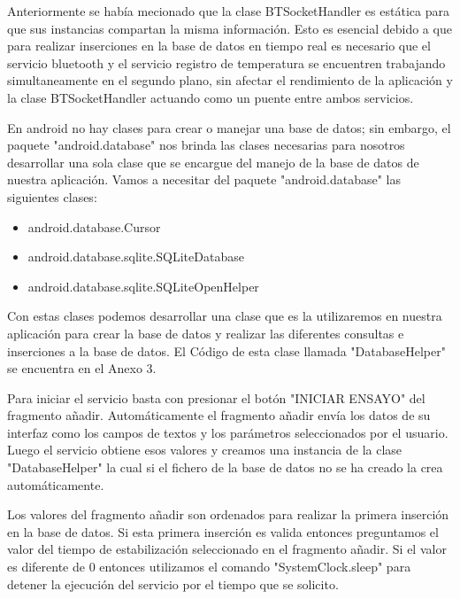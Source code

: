 \par \noindent
Anteriormente se había mecionado que la clase BTSocketHandler es estática para que sus instancias compartan la misma información. Esto es esencial debido a que para realizar inserciones en la base de datos en tiempo real es necesario que el servicio bluetooth y el servicio registro de temperatura se encuentren trabajando simultaneamente en el segundo plano, sin afectar el rendimiento de la aplicación y la clase BTSocketHandler actuando como un puente entre ambos servicios.

\par \noindent
En android no hay clases para crear o manejar una base de datos; sin embargo, el paquete "android.database" nos brinda las clases necesarias para nosotros desarrollar una sola clase que se encargue del manejo de la base de datos de nuestra aplicación. Vamos a necesitar del paquete "android.database" las siguientes clases:

\begin{itemize}
	
	\item android.database.Cursor
	
	\item android.database.sqlite.SQLiteDatabase
	
	\item android.database.sqlite.SQLiteOpenHelper
	
\end{itemize} 

\par \noindent
Con estas clases podemos desarrollar una clase que es la utilizaremos en nuestra aplicación para crear la base de datos y realizar las diferentes consultas e inserciones a la base de datos. El Código de esta clase llamada "DatabaseHelper" se encuentra en el Anexo 3.

\par \noindent
Para iniciar el servicio basta con presionar el botón "INICIAR ENSAYO" del fragmento añadir. Automáticamente el fragmento añadir envía los datos de su interfaz como los campos de textos y los parámetros seleccionados por el usuario. Luego el servicio obtiene esos valores y creamos una instancia de la clase "DatabaseHelper" la cual si el fichero de la base de datos no se ha creado la crea automáticamente. 

\par \noindent
Los valores del fragmento añadir son ordenados para realizar la primera inserción en la base de datos. Si esta primera inserción es valida entonces preguntamos el valor del tiempo de estabilización seleccionado en el fragmento añadir. Si el valor es diferente de 0 entonces utilizamos el comando "SystemClock.sleep" para detener la ejecución del servicio por el tiempo que se solicito.

